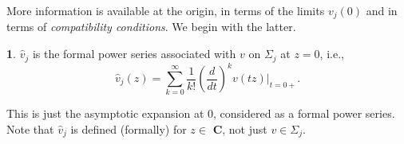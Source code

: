 \documentclass{surv-l}
\theoremstyle{plain}
\theoremstyle{definition}
\newtheorem{definition}[theorem]{\sc{Definition}}
\numberwithin{equation}{chapter}
\begin{document}
More information is available at the origin, in terms of the limits $v_{j}(0)$ and in terms of  \emph{compatibility conditions}. We begin with the latter.
\setcounter{theorem}{3}
\begin{definition}\label{defi13.4}
$\hat{v}_{j}$ is the formal power series associated with $v$ on $\Sigma_{j}$ at $z=0$, i.e.,
\begin{equation*}
\hat{v}_{j}(z)=\sum_{k=0}^{\infty}\frac{1}{k!}\left(\frac{d}{dt}\right)^{k}v(tz)|_{t=0+}.
\end{equation*}
\end{definition}
This is just the asymptotic expansion at $0$, considered as a formal power series. Note that $\hat{v}_{j}$ is defined (formally) for $z\in$ \textbf{C}, not just $v\in\Sigma_{j}$.
\end{document}
